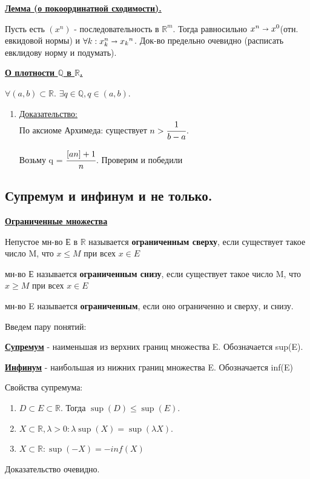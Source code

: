 \documentclass{article}
\newcommand{\deff}[1]{\underline{\textbf{#1}}}
\newcommand{\thmm}[1]{\underline{\textbf{#1}}}
\newcommand{\prooff}[1]{{\underline{Доказательство:}} \\ }
\begin{document}
    \thmm{Лемма (о покоординатной сходимости).}

    Пусть есть $(x^n)$ - последовательность в $\mathbb{R}^m$. Тогда равносильно $x^n\shortrightarrow x^0$(отн. евкидовой нормы) и $\forall k: x_k^n\shortrightarrow {x_k}^n$. Док-во предельно очевидно (расписать евклидову норму и подумать).


    \thmm{О плотности $\mathbb{Q}$ в $\mathbb{R}$.}

    $\forall (a,b) \subset \mathbb{R}$. $\exists q \in \mathbb{Q}, q \in (a,b)$.

    \begin{enumerate}
        \item[] \prooff{}
        По аксиоме Архимеда: существует $n > \cfrac{1}{b-a}$.

        Возьму q = $\cfrac{[an]+1}{n}$. Проверим и победили
    \end{enumerate}
 
        \subsection {Супремум и инфинум и не только.}

        \deff{Ограниченные множества}

 Непустое мн-во Е в $\mathbb{R}$ называется \textbf{ограниченным сверху}, если существует такое число M, что $x\leq M$ при всех $x \in E$

 мн-во Е называется \textbf{ограниченным снизу}, если существует такое число M, что $x\geq M$ при всех $x \in E$

 мн-во E называется \textbf{ограниченным}, если оно ограниченно и сверху, и снизу.

Введем пару понятий:

\deff{Супремум} - наименьшая из верхних границ множества E. Обозначается sup(E).

\deff{Инфинум} - наибольшая из нижних границ множества E. Обозначается inf(E)

Свойства супремума:
\begin{enumerate}
    \item $D \subset E \subset \mathbb{R}.$  Тогда $\sup(D)\leq \sup(E)$.
    \item $X \subset \mathbb{R}, \lambda>0: \lambda \sup(X)=\sup(\lambda X)$.
    \item $X \subset \mathbb{R}: \sup(-X) = -inf(X)$
\end{enumerate}
Доказательство очевидно.
\end{document}
